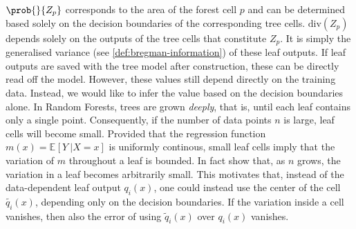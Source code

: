 \documentclass[
	twoside=false, %
]{kaobook}
\begin{document}
$\prob{}{Z_{p}}$ corresponds to the area of the forest cell $p$ and can be determined based solely on the decision boundaries of the corresponding tree cells.
$\text{div}(Z_{p})$ depends solely on the outputs of the tree cells that constitute $Z_{p}$. It is simply the generalised variance (see \ref{def:bregman-information}) of these leaf outputs. If leaf outputs are saved with the tree model after construction, these can be directly read off the model. However, these values still depend directly on the training data. Instead, we would like to infer the value based on the decision boundaries alone.
In Random Forests, trees are grown \textit{deeply}, that is, until each leaf contains only a single point. Consequently, if the number of data points $n$ is large, leaf cells will become small. Provided that the regression function $m(x) = \mathbb{E}_{}\left[ Y ~| X=x \right]$ is uniformly continous, small leaf cells imply that the variation of $m$ throughout a leaf is bounded. 
In fact \citeauthor{scornet_ConsistencyRandomForests_2015} show
that, as $n$ grows, the variation in a leaf becomes arbitrarily small.
This motivates that, instead of the data-dependent leaf output $q_{i}(x)$, one could instead use the center of the cell $\tilde{q_{i}}(x)$, depending only on the decision boundaries. If the variation inside a cell vanishes, then also the error of using $\tilde{q}_{i}(x)$ over $q_{i}(x)$ vanishes.

\end{document}
